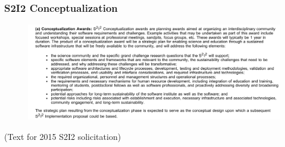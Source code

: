 \begin{frame}
\frametitle{S2I2 Conceptualization}

\begin{figure}[htbp]
\begin{center}
\includegraphics[width=1.0\textwidth]{images/image4.png}
\end{center}
\end{figure}

\small{(Text for 2015 S2I2 solicitation)}

\end{frame}


